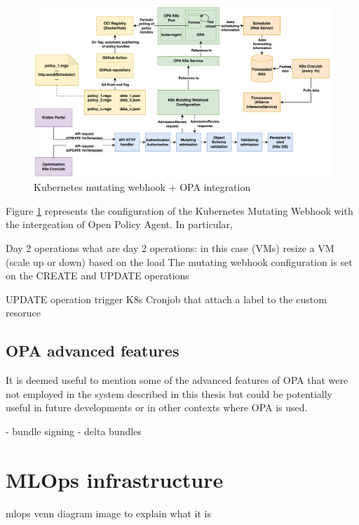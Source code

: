 \begin{figure}[htb]
\centering
\includegraphics[width=1\linewidth]{images/mutating_webhook+OPA_integration.png}
\caption{Kubernetes mutating webhook + OPA integration}
\label{fig:webhook+opa}
\end{figure}

Figure \ref{fig:webhook+opa} represents the configuration of the Kubernetes Mutating Webhook with the intergeation of Open Policy Agent.
In particular, 




Day 2 operations
what are day 2 operations: in this case (VMs) resize a VM (scale up or down) based on the load
The mutating webhook configuration is set on the CREATE and UPDATE operations

UPDATE operation trigger
K8s Cronjob that attach a label to the custom resoruce 


\subsection{OPA advanced features}

It is deemed useful to mention some of the advanced features of OPA that were not employed in the system described in this thesis but could be potentially useful in future developments or in other contexts where OPA is used.

- bundle signing
- delta bundles

\newpage



\section{MLOps infrastructure}

mlops venn diagram image
to explain what it is


